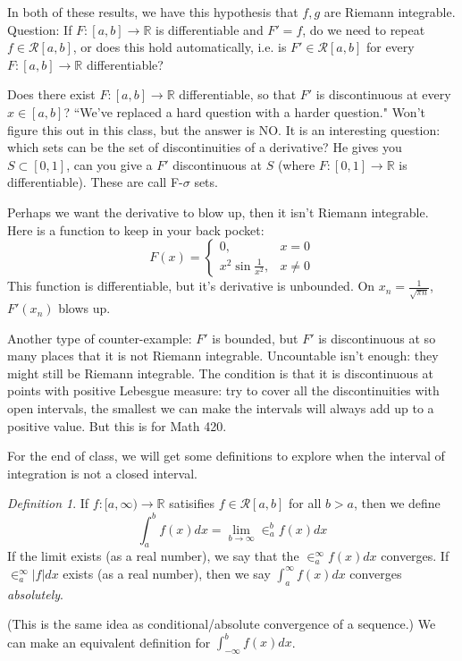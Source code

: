 \documentclass{article}
\theoremstyle{plain}
\theoremstyle{remark}
\newtheorem{definition}{Definition}
\newcommand{\R}{{\mathbb R}}
\begin{document}
In both of these results, we have this hypothesis that $f,g$
are Riemann integrable.
Question: If $F \colon [a,b] \to \R$ is differentiable and $F' = f$,
do we need to repeat $f \in \mathcal{R}[a,b]$,
or does this hold automatically,
i.e. is $F' \in \mathcal{R}[a,b]$ for every $F \colon [a,b] \to \R$ differentiable?

Does there exist $F \colon [a,b] \to \R$ differentiable,
so that $F'$ is discontinuous at every $x \in [a,b]$?
``We've replaced a hard question with a harder question."
Won't figure this out in this class, but the answer is NO.
It is an interesting question:
which sets can be the set of discontinuities of a derivative?
He gives you $S \subset [0,1]$, can you give a $F'$ discontinuous at $S$
(where $F \colon [0,1] \to \R$ is differentiable).
These are call F-$\sigma$ sets.


Perhaps we want the derivative to blow up, then it isn't Riemann integrable.
Here is a function to keep in your back pocket:
\[
	F(x) = \begin{cases}
		0, & x = 0\\
		x^2\sin\frac{1}{x^2}, & x\neq0
	\end{cases}
\]
This function is differentiable, but it's derivative is unbounded.
On $x_n = \frac{1}{\sqrt{\pi n}}$, $F'(x_n)$ blows up.

Another type of counter-example:
$F'$ is bounded, but $F'$ is discontinuous at
so many places that it is not Riemann integrable.
Uncountable isn't enough: they might still be Riemann integrable.
The condition is that it is discontinuous at points with positive Lebesgue measure:
try to cover all the discontinuities with open intervals,
the smallest we can make the intervals will always add up
to a positive value. But this is for Math 420.

For the end of class, we will get some definitions to
explore when the interval of integration is not a closed interval.
\begin{definition}
	If $f \colon [a,\infty) \to \R$ satisifies
	$f \in \mathcal{R}[a,b]$ for all $b>a$,
	then we define
	\[
		\int_a^b f(x)dx = \lim_{b\to\infty} \in_a^b f(x)dx
	\]
	If the limit exists (as a real number), we say that the $\in_a^\infty f(x)dx$ converges.
	If $\in_a^\infty \lvert f \rvert dx$ exists (as a real number),
	then we say $\int_a^\infty f(x)dx$ converges \emph{absolutely}.
\end{definition}
(This is the same idea as conditional/absolute convergence of a sequence.)
We can make an equivalent definition for $\int_{-\infty}^b f(x)dx$.
\end{document}

